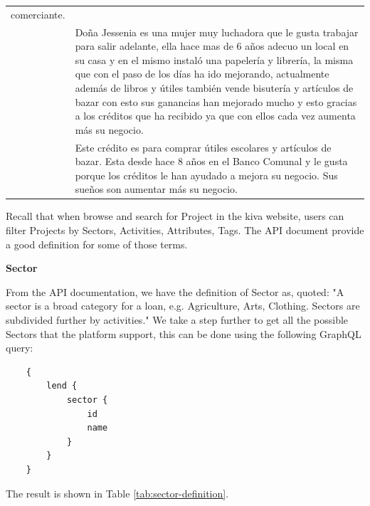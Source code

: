 \begin{longtable}{|p{}|p{}|}
	comerciante.                                                                                                                                                    \\
	                                                & Doña Jessenia es una mujer muy luchadora que le gusta trabajar para
	salir adelante, ella hace mas de 6 años adecuo un local en su casa y en
	el mismo instaló una papelería y librería, la misma que con el paso de
	los días ha ido mejorando, actualmente además de libros y útiles también
	vende bisutería y artículos de bazar con esto sus ganancias han mejorado
	mucho y esto gracias a los créditos que ha recibido ya que con ellos
	cada vez aumenta más su negocio.                                                                                                                                \\
	                                                & Este crédito es para comprar útiles escolares y artículos de bazar.
	Esta desde hace 8 años en el Banco Comunal y le gusta porque los
	créditos le han ayudado a mejora su negocio. Sus sueños son aumentar más
	su negocio.                                                                                                                                                     \\
\end{longtable}

Recall that when browse and search for Project in the kiva website,
users can filter Projects by Sectors, Activities, Attributes, Tags.
The API document provide a good definition for some of those terms.

\textbf{Sector}

From the API documentation, we have the definition of Sector as, quoted:
"A sector is a broad category for a loan, e.g. Agriculture, Arts, Clothing. Sectors are subdivided further by activities."
We take a step further to get all the possible Sectors that the platform support,
this can be done using the following GraphQL query:

\begin{lstlisting}
    {
        lend {
            sector {
                id
                name
            }
        }
    }
\end{lstlisting}

The result is shown in Table \ref{tab:sector-definition}.

